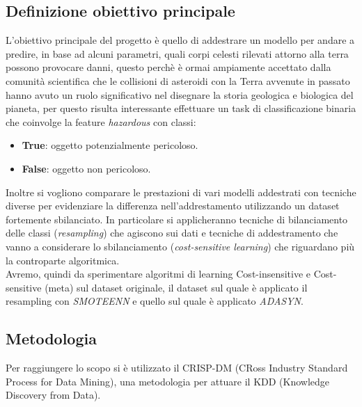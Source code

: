 \documentclass[italian,12pt,a4paper]{article}
\begin{document}
	\subsection{Definizione obiettivo principale}
	L'obiettivo principale del progetto è quello di addestrare un modello per andare a predire, in base ad alcuni parametri, quali corpi celesti rilevati attorno alla terra possono provocare danni, questo perchè è ormai ampiamente accettato dalla comunità scientifica che le collisioni di asteroidi con la Terra avvenute in passato hanno avuto un ruolo significativo nel disegnare la storia geologica e biologica del pianeta, per questo risulta interessante effettuare un task di classificazione binaria che coinvolge la feature \textit{hazardous} con classi:
	\begin{itemize}
		\item \textbf{True}: oggetto potenzialmente pericoloso.
		\item \textbf{False}: oggetto non pericoloso.
	\end{itemize}
	Inoltre si vogliono comparare le prestazioni di vari modelli addestrati con tecniche diverse per evidenziare la differenza nell'addrestamento utilizzando un dataset fortemente sbilanciato.
	In particolare si applicheranno tecniche di bilanciamento delle classi (\textit{resampling}) che agiscono sui dati e tecniche di addestramento che vanno a considerare lo sbilanciamento (\textit{cost-sensitive learning}) che riguardano più la controparte algoritmica. \\
	Avremo, quindi da sperimentare algoritmi di learning Cost-insensitive e Cost-sensitive (meta) sul dataset originale, il dataset sul quale è applicato il resampling con \textit{SMOTEENN} e quello sul quale è applicato \textit{ADASYN}.
	
	\subsection{Metodologia}
	
	Per raggiungere lo scopo si è utilizzato il CRISP-DM (CRoss Industry Standard Process for Data Mining), una metodologia per attuare il KDD (Knowledge Discovery from Data).
	
\end{document}
